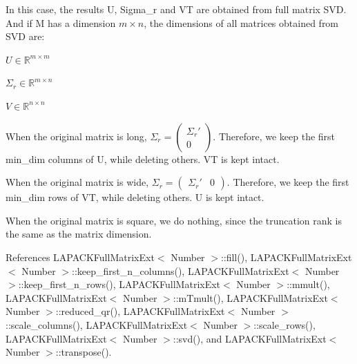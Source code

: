 In this case, the results {\ttfamily U}, {\ttfamily Sigma\+\_\+r} and {\ttfamily VT} are obtained from full matrix S\+VD. And if {\ttfamily M} has a dimension $m \times n$, the dimensions of all matrices obtained from S\+VD are\+:
\begin{DoxyItemize}
\item $U \in \mathbb{R}^{m \times m}$
\item $\Sigma_r \in \mathbb{R}^{m \times n}$
\item $V \in \mathbb{R}^{n \times n}$
\end{DoxyItemize}

When the original matrix is long, $\Sigma_r = \begin{pmatrix}\Sigma_r' \\ 0 \end{pmatrix}$. Therefore, we keep the first {\ttfamily min\+\_\+dim} columns of {\ttfamily U}, while deleting others. {\ttfamily VT} is kept intact.

When the original matrix is wide, $\Sigma_r = \begin{pmatrix} \Sigma_r' & 0 \end{pmatrix}$. Therefore, we keep the first {\ttfamily min\+\_\+dim} rows of {\ttfamily VT}, while deleting others. {\ttfamily U} is kept intact.

When the original matrix is square, we do nothing, since the truncation rank is the same as the matrix dimension.

References L\+A\+P\+A\+C\+K\+Full\+Matrix\+Ext$<$ Number $>$\+::fill(), L\+A\+P\+A\+C\+K\+Full\+Matrix\+Ext$<$ Number $>$\+::keep\+\_\+first\+\_\+n\+\_\+columns(), L\+A\+P\+A\+C\+K\+Full\+Matrix\+Ext$<$ Number $>$\+::keep\+\_\+first\+\_\+n\+\_\+rows(), L\+A\+P\+A\+C\+K\+Full\+Matrix\+Ext$<$ Number $>$\+::mmult(), L\+A\+P\+A\+C\+K\+Full\+Matrix\+Ext$<$ Number $>$\+::m\+Tmult(), L\+A\+P\+A\+C\+K\+Full\+Matrix\+Ext$<$ Number $>$\+::reduced\+\_\+qr(), L\+A\+P\+A\+C\+K\+Full\+Matrix\+Ext$<$ Number $>$\+::scale\+\_\+columns(), L\+A\+P\+A\+C\+K\+Full\+Matrix\+Ext$<$ Number $>$\+::scale\+\_\+rows(), L\+A\+P\+A\+C\+K\+Full\+Matrix\+Ext$<$ Number $>$\+::svd(), and L\+A\+P\+A\+C\+K\+Full\+Matrix\+Ext$<$ Number $>$\+::transpose().

\mbox{\label{classLAPACKFullMatrixExt_a4b4bb2b69261608f54c42f329d272195}} 
